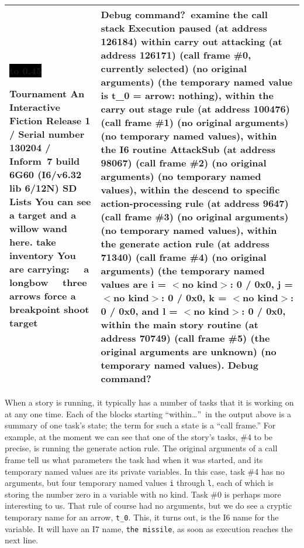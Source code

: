 \documentclass{book}
\newcommand{\n}{\hspace*{\fill}\newline}
\newcommand{\terp}[2]{\begin{center}\begin{tabular}{p{0.45\textwidth}|p{0.45\textwidth}}\midrule #1&#2\\\midrule\end{tabular}\end{center}}
\newcommand{\glkheading}[1]{\textbf{#1}}
\newcommand{\glkinput}[1]{\textbf{#1}}
\newcommand{\glkstatusline}[2]{\centerline{\colorbox{black}{\hbox to 0.45\textwidth{\textcolor{white}{#1\hfil #2}}}}}
\newcommand{\storyprompt}{\raisebox{1.5pt}{\(>\)}}
\newcommand{\cursor}{\raisebox{-1.5pt}{\RectangleThin}}
\begin{document}
\terp{\glkstatusline{Lists}{0/2}\n
  \glkheading{Tournament}\n
  An Interactive Fiction\n
  Release 1 / Serial number 130204 / Inform~7 build 6G60 (I6/v6.32 lib 6/12N) SD\n
  \n
  \glkheading{Lists}\n
  You can see a target and a willow wand here.\n
  \n
  \storyprompt\glkinput{take inventory}\n
  You are carrying:\n
  \null\ \ a longbow\n
  \null\ \ three arrows\n
  \n
  \storyprompt\glkinput{force a breakpoint}\n
  \storyprompt\glkinput{shoot target}}{%
  Debug command?\ \glkinput{examine the call stack}\n
  \n
  Execution paused (at address 126184)\n
  within carry out attacking (at address 126171) (call frame \#0, currently selected)\n
  \null\qquad (no original arguments)\n
  \null\qquad (the temporary named value is\n
  \null\qquad \qquad t\_0 = arrow: nothing),\n
  within the carry out stage rule (at address 100476) (call frame \#1)\n
  \null\qquad (no original arguments)\n
  \null\qquad (no temporary named values),\n
  within the I6 routine AttackSub (at address 98067) (call frame \#2)\n
  \null\qquad (no original arguments)\n
  \null\qquad (no temporary named values),\n
  within the descend to specific action-processing rule (at address 9647) (call frame \#3)\n
  \null\qquad (no original arguments)\n
  \null\qquad (no temporary named values),\n
  within the generate action rule (at address 71340) (call frame \#4)\n
  \null\qquad (no original arguments)\n
  \null\qquad (the temporary named values are\n
  \null\qquad \qquad i = \(<\)no kind\(>\): 0 / 0x0,\n
  \null\qquad \qquad j = \(<\)no kind\(>\): 0 / 0x0,\n
  \null\qquad \qquad k = \(<\)no kind\(>\): 0 / 0x0, and\n
  \null\qquad \qquad l = \(<\)no kind\(>\): 0 / 0x0,\n
  within the main story routine (at address 70749) (call frame \#5)\n
  \null\qquad (the original arguments are unknown)\n
  \null\qquad (no temporary named values).\n
  \n
  Debug command?\ \cursor}

When a story is running, it typically has a number of tasks that it is working
on at any one time.  Each of the blocks starting ``within\dots''\ in the output
above is a summary of one task's state; the term for such a state is a ``call
frame.''  For example, at the moment we can see that one of the story's tasks,
\#4 to be precise, is running the generate action rule.  The original arguments
of a call frame tell us what parameters the task had when it was started, and
its temporary named values are its private variables.  In this case, task \#4
has no arguments, but four temporary named values \lstinline{i} through
\lstinline{l}, each of which is storing the number zero in a variable with no
kind.  Task \#0 is perhaps more interesting to us.  That rule of course had no
arguments, but we do see a cryptic temporary name for an arrow, \lstinline{t_0}.
This, it turns out, is the I6 name for the variable.  It will have an I7 name,
\lstinline{the missile}, as soon as execution reaches the next line.
\end{document}
